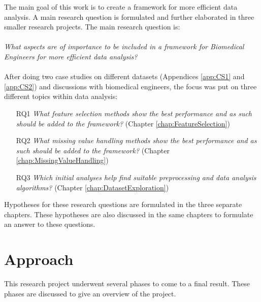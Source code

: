 \documentclass[10pt,a4paper]{report}
\begin{document}
	The main goal of this work is to create a framework for more efficient data analysis. A main research question is formulated and further elaborated in three smaller research projects. The main research question is:\\
	\\
	\emph{What aspects are of importance to be included in a framework for Biomedical Engineers for more efficient data analysis?}\\
	\\
	
	After doing two case studies on different datasets (Appendices \ref{app:CS1} and \ref{app:CS2}) and discussions with biomedical engineers, the focus was put on three different topics within data analysis:
	
	\begin{itemize}
		\item[RQ1] \emph{What feature selection methods show the best performance and as such should be added to the framework?} (Chapter \ref{chap:FeatureSelection}) \\
		
		\item[RQ2] \emph{What missing value handling methods show the best performance and as such should be added to the framework?} (Chapter \ref{chap:MissingValueHandling}) \\
		
		\item[RQ3] \emph{Which initial analyses help find suitable preprocessing and data analysis algorithms?} (Chapter \ref{chap:DatasetExploration}) \\
	\end{itemize}
	
	Hypotheses for these research questions are formulated in the three separate chapters. These hypotheses are also discussed in the same chapters to formulate an answer to these questions.
	
	\section{Approach}
	\label{sec:Approach}
	
	This research project underwent several phases to come to a final result. These phases are discussed to give an overview of the project.
	
\end{document}
